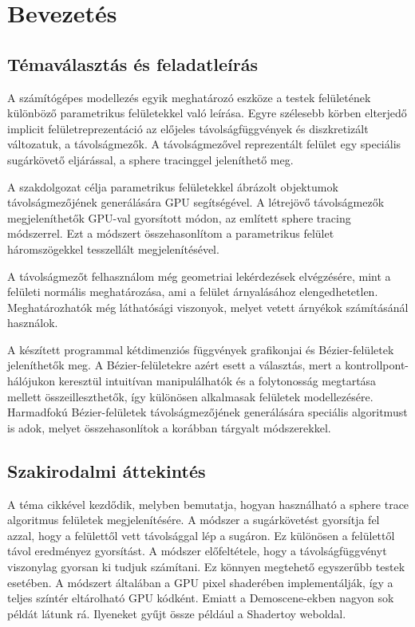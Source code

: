 \chapter{Bevezetés}
\label{ch:intro}

\section{Témaválasztás és feladatleírás}

A számítógépes modellezés egyik meghatározó eszköze a testek felületének különböző parametrikus felületekkel való leírása. Egyre szélesebb körben elterjedő implicit felületreprezentáció az előjeles távolságfüggvények és diszkretizált változatuk, a távolságmezők. A távolságmezővel reprezentált felület egy speciális sugárkövető eljárással, a sphere tracinggel jeleníthető meg.

A szakdolgozat célja parametrikus felületekkel ábrázolt objektumok távolságmezőjének generálására GPU segítségével. A létrejövő távolságmezők megjeleníthetők GPU-val gyorsított módon, az említett sphere tracing módszerrel. Ezt a módszert összehasonlítom a parametrikus felület háromszögekkel tesszellált megjelenítésével.

A távolságmezőt felhasználom még geometriai lekérdezések elvégzésére, mint a felületi normális meghatározása, ami a felület árnyalásához elengedhetetlen. Meghatározhatók még láthatósági viszonyok, melyet vetett árnyékok számításánál használok.

A készített programmal kétdimenziós függvények grafikonjai és Bézier-felületek jeleníthetők meg. A Bézier-felületekre azért esett a választás, mert a kontrollpont-hálójukon keresztül intuitívan manipulálhatók és a folytonosság megtartása mellett összeilleszthetők, így különösen alkalmasak felületek modellezésére. Harmadfokú Bézier-felületek távolságmezőjének generálására speciális algoritmust is adok, melyet összehasonlítok a korábban tárgyalt módszerekkel.

\section{Szakirodalmi áttekintés}

A téma \citeauthor{Hart1996} cikkével \cite{Hart1996} kezdődik, melyben bemutatja, hogyan használható a sphere trace algoritmus felületek megjelenítésére. A módszer a sugárkövetést gyorsítja fel azzal, hogy a felülettől vett távolsággal lép a sugáron. Ez különösen a felülettől távol eredményez gyorsítást. A módszer előfeltétele, hogy a távolságfüggvényt viszonylag gyorsan ki tudjuk számítani. Ez könnyen megtehető egyszerűbb testek esetében. A módszert általában a GPU pixel shaderében implementálják, így a teljes színtér eltárolható GPU kódként. Emiatt a Demoscene-ekben nagyon sok példát látunk rá. Ilyeneket gyűjt össze például a Shadertoy weboldal.

